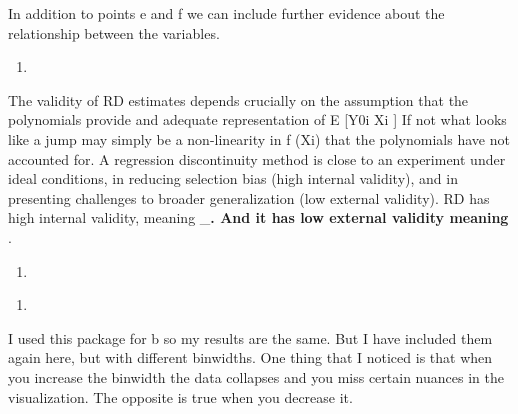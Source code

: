 \documentclass[
  12pt,
  landscape]{article}
\begin{document}
In addition to points e and f we can include further evidence about the
relationship between the variables.

\begin{enumerate}
\def\labelenumi{(\alph{enumi})}
\setcounter{enumi}{7}
\item
\end{enumerate}

The validity of RD estimates depends crucially on the assumption that
the polynomials provide and adequate representation of E {[}Y0i
\textbar{} Xi {]} If not what looks like a jump may simply be a
non-linearity in f (Xi) that the polynomials have not accounted for. A
regression discontinuity method is close to an experiment under ideal
conditions, in reducing selection bias (high internal validity), and in
presenting challenges to broader generalization (low external validity).
RD has high internal validity, meaning \_\textbf{. And it has low
external validity meaning }.

\begin{enumerate}
\def\labelenumi{(\roman{enumi})}
\item
\end{enumerate}

\begin{enumerate}
\def\labelenumi{(\alph{enumi})}
\setcounter{enumi}{9}
\item
\end{enumerate}

I used this package for b so my results are the same. But I have
included them again here, but with different binwidths. One thing that I
noticed is that when you increase the binwidth the data collapses and
you miss certain nuances in the visualization. The opposite is true when
you decrease it.
\end{document}
